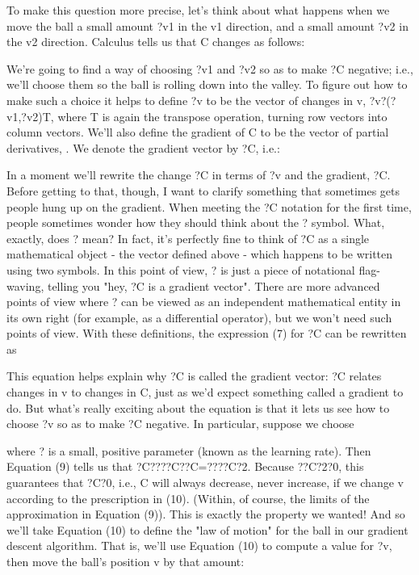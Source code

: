To make this question more precise, let's think about what happens when we move the ball a small amount ?v1 in the v1 direction, and a small amount ?v2 in the v2 direction. Calculus tells us that C changes as follows: 

We're going to find a way of choosing ?v1 and ?v2 so as to make ?C negative; i.e., we'll choose them so the ball is rolling down into the valley. To figure out how to make such a choice it helps to define ?v to be the vector of changes in v, ?v?(?v1,?v2)T, where T is again the transpose operation, turning row vectors into column vectors. We'll also define the gradient of C to be the vector of partial derivatives, . We denote the gradient vector by ?C, i.e.: 

In a moment we'll rewrite the change ?C in terms of ?v and the gradient, ?C. Before getting to that, though, I want to clarify something that sometimes gets people hung up on the gradient. When meeting the ?C notation for the first time, people sometimes wonder how they should think about the ? symbol. What, exactly, does ? mean? In fact, it's perfectly fine to think of ?C as a single mathematical object - the vector defined above - which happens to be written using two symbols. In this point of view, ? is just a piece of notational flag-waving, telling you "hey, ?C is a gradient vector". There are more advanced points of view where ? can be viewed as an independent mathematical entity in its own right (for example, as a differential operator), but we won't need such points of view.
With these definitions, the expression (7) for ?C can be rewritten as 

This equation helps explain why ?C is called the gradient vector: ?C relates changes in v to changes in C, just as we'd expect something called a gradient to do. But what's really exciting about the equation is that it lets us see how to choose ?v so as to make ?C negative. In particular, suppose we choose 

where ? is a small, positive parameter (known as the learning rate). Then Equation (9) tells us that ?C????C??C=????C?2. Because ??C?2?0, this guarantees that ?C?0, i.e., C will always decrease, never increase, if we change v according to the prescription in (10). (Within, of course, the limits of the approximation in Equation (9)). This is exactly the property we wanted! And so we'll take Equation (10) to define the "law of motion" for the ball in our gradient descent algorithm. That is, we'll use Equation (10) to compute a value for ?v, then move the ball's position v by that amount: 

